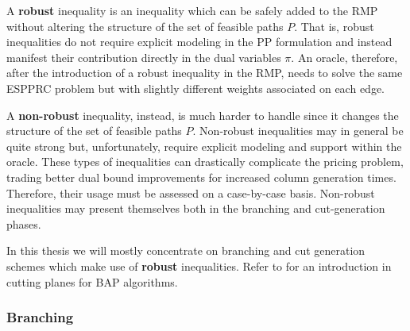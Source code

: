 A \textbf{robust} inequality is an inequality
which can be safely added to the RMP
without altering the structure of the set of feasible paths $P$.
That is,
robust inequalities do not require explicit modeling in the PP formulation
and instead manifest their contribution directly in the dual variables $\pi$.
An oracle, therefore,
after the introduction of a robust inequality in the RMP,
needs to solve the same ESPPRC problem but with slightly different weights associated on each edge.

A \textbf{non-robust} inequality, instead,
is much harder to handle since it changes the structure of the set of feasible paths $P$.
Non-robust inequalities may in general be quite strong but,
unfortunately, require explicit modeling and support within the oracle.
These types of inequalities can drastically complicate the pricing problem,
trading better dual bound improvements for increased column generation times.
Therefore, their usage must be assessed on a case-by-case basis.
Non-robust inequalities may present themselves both in the branching and cut-generation phases.

In this thesis
we will mostly concentrate on branching and cut generation schemes
which make use of \textbf{robust} inequalities.
Refer to \textcite{desaulniers2011} for an introduction in cutting planes for BAP algorithms.


\begin{comment}
When a violated inequality in the two/three-index formulation is found, it is decomposed at runtime and introduced in the master problem.
\end{comment}

\begin{comment}
\cite{jepsen2011}
The other method is enumeration which has proven to be very successful
for both cvrp[1] and vrptw[3]. In enumeration an upper bound U B and
a lower bound LB are used. From reduced cost fixing of a binary variable
it is know that any non basic column with a reduced cost strictly greater
than the gap ub − lb can not be part of an integer solution which is an
improvement of the current solution. This complete set of columns can be
found by solving an espprc using the dominance rule in proposition 5 and
bounding functions. Once we have added the columns with reduced cost less
than or equal to the gap the resulting problem can be solved as an integer
optimization problem.
\end{comment}



\subsubsection{Branching}
\label{sec:bap-branching}

